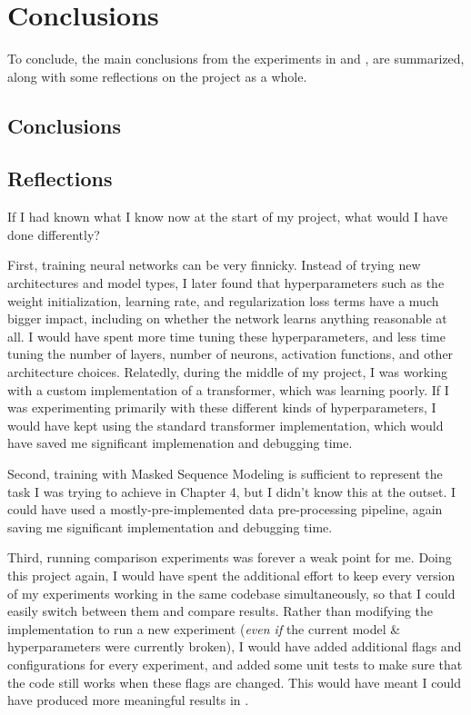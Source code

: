 \chapter{Conclusions}
\label{C:conclusion}

To conclude, the main conclusions from the experiments in  and , are summarized, along with some reflections on the project as a whole.

\section{Conclusions}


\section{Reflections}

If I had known what I know now at the start of my project, what would I have done differently?

First, training neural networks can be very finnicky. Instead of trying new architectures and model types, I later found that hyperparameters such as the weight initialization, learning rate, and regularization loss terms have a much bigger impact, including on whether the network learns anything reasonable at all. I would have spent more time tuning these hyperparameters, and less time tuning the number of layers, number of neurons, activation functions, and other architecture choices. Relatedly, during the middle of my project, I was working with a custom implementation of a transformer, which was learning poorly. If I was experimenting primarily with these different kinds of hyperparameters, I would have kept using the standard transformer implementation, which would have saved me significant implemenation and debugging time.

Second, training with Masked Sequence Modeling is sufficient to represent the task I was trying to achieve in Chapter 4, but I didn't know this at the outset. I could have used a mostly-pre-implemented data pre-processing pipeline, again saving me significant implementation and debugging time.

Third, running comparison experiments was forever a weak point for me. Doing this project again, I would have spent the additional effort to keep every version of my experiments working in the same codebase simultaneously, so that I could easily switch between them and compare results. Rather than modifying the implementation to run a new experiment (\textit{even if} the current model \& hyperparameters were currently broken), I would have added additional flags and configurations for every experiment, and added some unit tests to make sure that the code still works when these flags are changed.  This would have meant I could have produced more meaningful results in .

